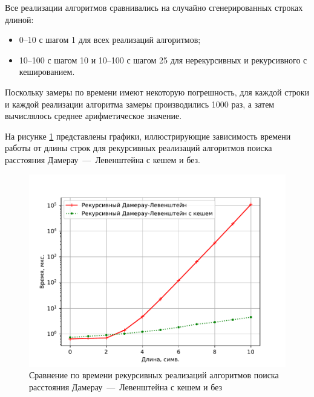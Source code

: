 Все реализации алгоритмов сравнивались на случайно сгенерированных строках длиной:
\begin{itemize}
	\item 0--10 с шагом 1 для всех реализаций алгоритмов;
	\item 10--100 с шагом 10 и 10--100 с шагом 25 для нерекурсивных и рекурсивного с кешированием. 
\end{itemize}

Поскольку замеры по времени имеют некоторую погрешность, для каждой строки и каждой реализации алгоритма замеры производились 1000 раз, а затем вычислялось среднее арифметическое значение.

На рисунке \ref{plt:time_01} представлены графики, иллюстрирующие зависимость времени работы от длины строк для рекурсивных реализаций алгоритмов поиска расстояния Дамерау~---~Левенштейна с кешем и без.
\begin{figure}[H]
	\centering
	\includegraphics[height=0.5\textheight, page=1]{img/figures.pdf}
	\caption{Сравнение по времени рекурсивных реализаций алгоритмов поиска расстояния Дамерау~---~Левенштейна с кешем и без}
	\label{plt:time_01}
\end{figure}

